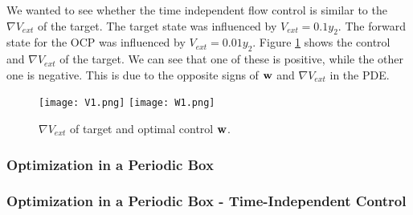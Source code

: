 We wanted to see whether the time independent flow control is similar to the $\nabla V_{ext}$ of the target.
The target state was influenced by $V_{ext} = 0.1 y_2$. The forward state for the OCP was influenced by $V_{ext} = 0.01 y_2$. 
Figure \ref{F1a} shows the control and $\nabla V_{ext}$ of the target. We can see that one of these is positive, while the other one is negative. This is due to the opposite signs of $\mathbf{w}$ and $\nabla V_{ext}$ in the PDE.

\begin{figure}[h]
	\centering
	\texttt{[image: V1.png]}
	\texttt{[image: W1.png]}
	\caption{$\nabla V_{ext}$ of target and optimal control $\mathbf{w}$.} 
	\label{F1a}
\end{figure}

\subsubsection{Optimization in a Periodic Box}

\subsubsection{Optimization in a Periodic Box - Time-Independent Control}

